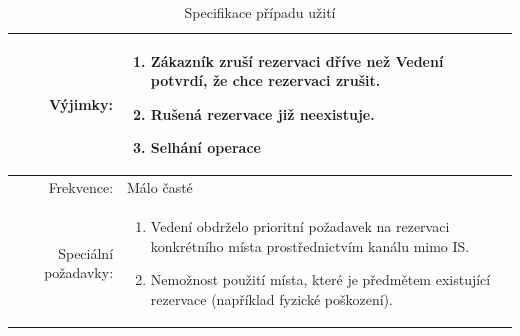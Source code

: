 \documentclass[a4paper,10pt]{article}
\begin{document}
\begin{center}
\begin{table}[ht!]
{\begin{tabular}{| r | p{12cm} |}
    \hline
    Výjimky: & 
    \begin{minipage}[t]{0.75\textwidth}
    	\begin{enumerate}[nosep,after=\strut]
    		\item Zákazník zruší rezervaci dříve než Vedení potvrdí, že chce rezervaci zrušit.
            \item Rušená rezervace již neexistuje. 
            \item Selhání operace
    	\end{enumerate}
  	\end{minipage} \\
    \hline
    Frekvence: & Málo časté \\
    \hline
    Speciální požadavky: & 
    \begin{minipage}[t]{0.75\textwidth}
    	\begin{enumerate}[nosep,after=\strut]
    		\item Vedení obdrželo prioritní požadavek na rezervaci konkrétního místa prostřednictvím kanálu mimo IS.
            \item Nemožnost použití místa, které je předmětem existující rezervace (například fyzické poškození).
    	\end{enumerate}
  	\end{minipage} \\
    \hline
\end{tabular}}
\caption{Specifikace případu užití }
\label{table:7}
\end{table}
\end{center}
\end{document}
